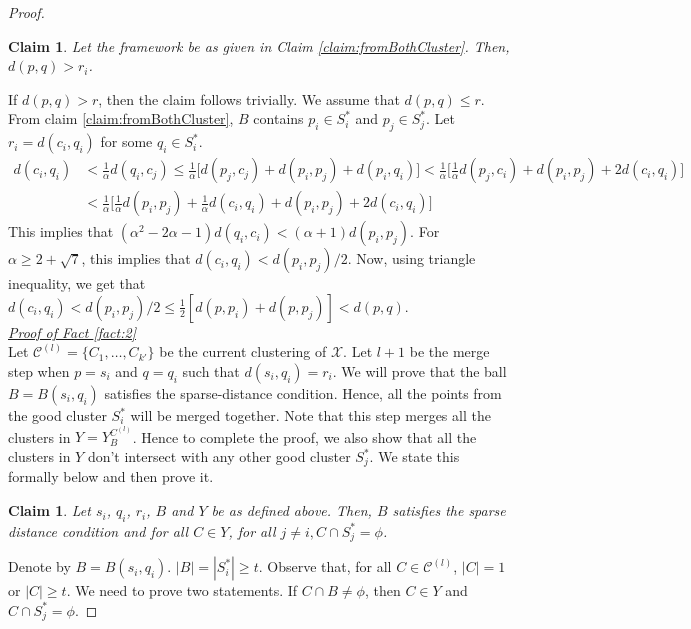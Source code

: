 \documentclass[anon,12pt]{colt2016} %
\newtheorem{claim}[theorem]{Claim}
\newcommand{\mc}{\mathcal}
\begin{document}
\begin{proof}
\begin{claim}
\label{claim:maxrirj}
Let the framework be as given in Claim \ref{claim:fromBothCluster}. Then, $d(p, q) > r_i$.
\end{claim}

\vspace{-0.1in} If $d(p, q) > r$, then the claim follows trivially. We assume that $d(p, q) \le r$. From claim \ref{claim:fromBothCluster}, $B$ contains $p_i \in S_i^*$ and $p_j \in S_j^*$. Let $r_i = d(c_i, q_i)$ for some $q_i \in S_i^*$.
\begin{align*}
d(c_i, q_i) &< \frac{1}{\alpha} d(q_i, c_j) \le \frac{1}{\alpha} \bigg[ d(p_j, c_j) + d(p_i, p_j) + d(p_i, q_i)\bigg] < \frac{1}{\alpha} \bigg[ \frac{1}{\alpha}d(p_j, c_i) + d(p_i, p_j) + 2d(c_i, q_i)\bigg]\\
& < \frac{1}{\alpha} \bigg[ \frac{1}{\alpha}d(p_i, p_j) + \frac{1}{\alpha}d(c_i, q_i) + d(p_i, p_j) + 2d(c_i, q_i)\bigg]
\end{align*}
This implies that $(\alpha^2 - 2\alpha - 1)d(q_i, c_i) < (\alpha + 1) d(p_i, p_j)$. For $\alpha \ge 2 + \sqrt 7$, this implies that $d(c_i, q_i) < d(p_i, p_j)/2$. Now, using triangle inequality, we get that $d(c_i, q_i) < d(p_i, p_j)/2 \le \frac{1}{2}[d(p, p_i) + d(p, p_j)] < d(p, q)$.\\

\noindent\textit{\underline{Proof of Fact \ref{fact:2}
}}\\
Let $\mc C^{(l)} = \{C_1, \ldots, C_{k'}\}$ be the current clustering of $\mc X$. Let $l+1$ be the merge step when $p = s_i$ and $q = q_i$ such that $d(s_i, q_i) = r_i$. We will prove that the ball $B = B(s_i, q_i)$ satisfies the sparse-distance condition. Hence, all the points from the good cluster $S_i^*$ will be merged together. Note that this step merges all the clusters in $Y = Y_B^{C^{(l)}}$. Hence to complete the proof, we also show that all the clusters in $Y$ don't intersect with any other good cluster $S_j^*$. We state this formally below and then prove it.

\begin{claim}
\label{claim:dciqi}
Let $s_i$, $q_i$, $r_i$, $B$ and $Y$ be as defined above. Then, $B$ satisfies the sparse distance condition and for all $C \in Y$, for all $j \neq i, C \cap S_j^* = \phi$.
\end{claim}

\vspace{-0.1in} Denote by $B = B(s_i, q_i)$. $|B| = |S_i^*| \ge t$. Observe that, for all $C \in \mc C^{(l)}$, $|C| = 1$ or $|C| \ge t$. We need to prove two statements. If $C \cap B \neq \phi$, then $C \in Y$ and $C \cap S_j^* = \phi$. 


\end{proof}
\end{document}

